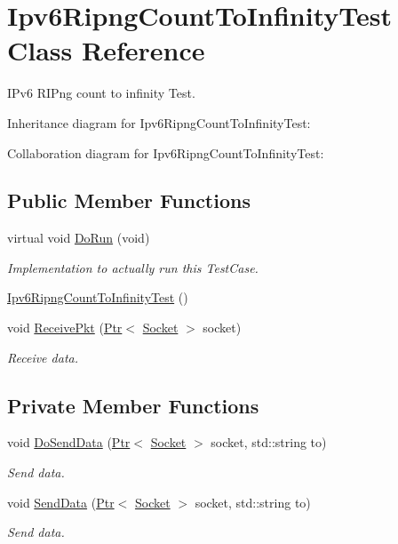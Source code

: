 \hypertarget{classIpv6RipngCountToInfinityTest}{}\section{Ipv6\+Ripng\+Count\+To\+Infinity\+Test Class Reference}
\label{classIpv6RipngCountToInfinityTest}


I\+Pv6 R\+I\+Png count to infinity Test.  




Inheritance diagram for Ipv6\+Ripng\+Count\+To\+Infinity\+Test\+:


Collaboration diagram for Ipv6\+Ripng\+Count\+To\+Infinity\+Test\+:
\subsection*{Public Member Functions}
\begin{DoxyCompactItemize}
\item 
virtual void \hyperlink{classIpv6RipngCountToInfinityTest_af62c0342d626eafa5b632b92c8636eb3}{Do\+Run} (void)
\begin{DoxyCompactList}\small\item\em Implementation to actually run this Test\+Case. \end{DoxyCompactList}\item 
\hyperlink{classIpv6RipngCountToInfinityTest_a92ed5dbecb471f7fd7ecd4887ddfac18}{Ipv6\+Ripng\+Count\+To\+Infinity\+Test} ()
\item 
void \hyperlink{classIpv6RipngCountToInfinityTest_ad11ef9b746354ff86cd7ffd12e144a12}{Receive\+Pkt} (\hyperlink{classns3_1_1Ptr}{Ptr}$<$ \hyperlink{classns3_1_1Socket}{Socket} $>$ socket)
\begin{DoxyCompactList}\small\item\em Receive data. \end{DoxyCompactList}\end{DoxyCompactItemize}
\subsection*{Private Member Functions}
\begin{DoxyCompactItemize}
\item 
void \hyperlink{classIpv6RipngCountToInfinityTest_a899ab86583435db2105b53905f8ef6bf}{Do\+Send\+Data} (\hyperlink{classns3_1_1Ptr}{Ptr}$<$ \hyperlink{classns3_1_1Socket}{Socket} $>$ socket, std\+::string to)
\begin{DoxyCompactList}\small\item\em Send data. \end{DoxyCompactList}\item 
void \hyperlink{classIpv6RipngCountToInfinityTest_a6669f1fe087ad5e126a0929da2e72320}{Send\+Data} (\hyperlink{classns3_1_1Ptr}{Ptr}$<$ \hyperlink{classns3_1_1Socket}{Socket} $>$ socket, std\+::string to)
\begin{DoxyCompactList}\small\item\em Send data. \end{DoxyCompactList}\end{DoxyCompactItemize}
